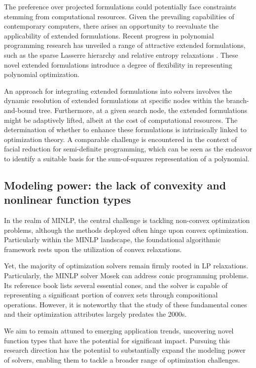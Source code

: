 The preference over projected formulations could potentially face constraints stemming from computational resources. Given the prevailing capabilities of contemporary computers, there arises an opportunity to reevaluate the applicability of extended formulations. Recent progress in polynomial programming research has unveiled a range of attractive extended formulations, such as the sparse Lasserre hierarchy and relative entropy relaxations \cite{murray2021signomial}. These novel extended formulations introduce a degree of flexibility in representing polynomial optimization.





An approach for integrating extended formulations into solvers involves the dynamic resolution of extended formulations at specific nodes within the branch-and-bound tree. Furthermore, at a given search node, the extended formulations might be adaptively lifted, albeit at the cost of computational resources. The determination of whether to enhance these formulations is intrinsically linked to optimization theory. A comparable challenge is encountered in the context of facial reduction for semi-definite programming, which can be seen as the endeavor to identify a suitable basis for the sum-of-squares representation of a polynomial.


\subsection{Modeling power: the lack of convexity and nonlinear function types}



In the realm of MINLP, the central challenge is tackling non-convex optimization problems, although the methods deployed often hinge upon convex optimization. Particularly within the MINLP landscape, the foundational algorithmic framework rests upon the utilization of convex relaxations.

Yet, the majority of optimization solvers remain firmly rooted in LP relaxations.   Particularly, the MINLP solver Mosek can address conic programming problems. Its  reference book \cite{aps2018mosek} lists several essential cones, and the solver is capable of representing a significant portion of convex  sets through compositional operations. However, it is noteworthy that the study of these fundamental cones and their optimization attributes largely predates the 2000s. 


We aim to remain attuned to emerging application trends, uncovering novel function types that have the potential for significant impact. Pursuing this research direction has the potential to substantially expand the modeling power of solvers, enabling them to tackle a broader range of optimization challenges.

